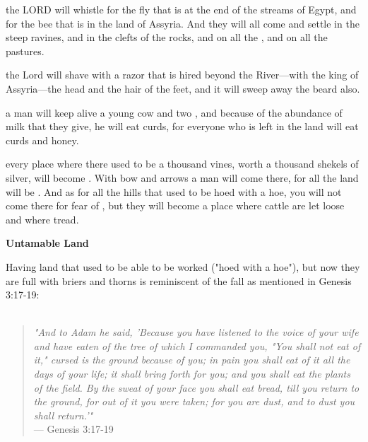 \documentclass[11pt]{article}
\begin{document}
\begin{biblicaloutline}[Isaiah 7:18-25]

    \begin{versesection}{2em}
          the LORD will whistle for the fly that is at the end of the streams of Egypt, and for the bee that is in the land of Assyria.  And they will all come and settle in the steep ravines, and in the clefts of the rocks, and on all the , and on all the pastures.
        
          the Lord will shave with a razor that is hired beyond the River—with the king of Assyria—the head and the hair of the feet, and it will sweep away the beard also.

          a man will keep alive a young cow and two ,  and because of the abundance of milk that they give, he will eat curds, for everyone who is left in the land will eat curds and honey.
        
          every place where there used to be a thousand vines, worth a thousand shekels of silver, will become .  With bow and arrows a man will come there, for all the land will be .  And as for all the hills that used to be hoed with a hoe, you will not come there for fear of , but they will become a place where cattle are let loose and where  tread.
    \end{versesection}

\end{biblicaloutline}

\vspace{3em}
{\large\bfseries Untamable Land}
\vspace{1em}

Having land that used to be able to be worked ("hoed with a hoe"), but now they are full with briers and thorns is reminiscent of the fall as mentioned in Genesis 3:17-19:
\\\\
\begin{quote}
\textit{"And to Adam he said, 'Because you have listened to the voice of your wife and have eaten of the tree of which I commanded you, "You shall not eat of it," cursed is the ground because of you; in pain you shall eat of it all the days of your life;  it shall bring forth for you; and you shall eat the plants of the field. By the sweat of your face you shall eat bread, till you return to the ground, for out of it you were taken; for you are dust, and to dust you shall return.'"} \\
\hfill --- Genesis 3:17-19
\end{quote}
\vspace{1em}
\end{document}
